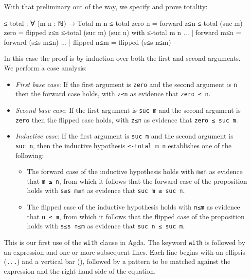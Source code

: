 With that preliminary out of the way, we specify and prove totality:

\begin{fence}
\begin{code}
≤-total : ∀ (m n : ℕ) → Total m n
≤-total zero    n                         =  forward z≤n
≤-total (suc m) zero                      =  flipped z≤n
≤-total (suc m) (suc n) with ≤-total m n
...                        | forward m≤n  =  forward (s≤s m≤n)
...                        | flipped n≤m  =  flipped (s≤s n≤m)
\end{code}
\end{fence}

In this case the proof is by induction over both the first and second
arguments. We perform a case analysis:

\begin{itemize}
\item
  \emph{First base case}: If the first argument is \texttt{zero} and the
  second argument is \texttt{n} then the forward case holds, with
  \texttt{z≤n} as evidence that \texttt{zero\ ≤\ n}.
\item
  \emph{Second base case}: If the first argument is \texttt{suc\ m} and
  the second argument is \texttt{zero} then the flipped case holds, with
  \texttt{z≤n} as evidence that \texttt{zero\ ≤\ suc\ m}.
\item
  \emph{Inductive case}: If the first argument is \texttt{suc\ m} and
  the second argument is \texttt{suc\ n}, then the inductive hypothesis
  \texttt{≤-total\ m\ n} establishes one of the following:

  \begin{itemize}
  \item
    The forward case of the inductive hypothesis holds with \texttt{m≤n}
    as evidence that \texttt{m\ ≤\ n}, from which it follows that the
    forward case of the proposition holds with \texttt{s≤s\ m≤n} as
    evidence that \texttt{suc\ m\ ≤\ suc\ n}.
  \item
    The flipped case of the inductive hypothesis holds with \texttt{n≤m}
    as evidence that \texttt{n\ ≤\ m}, from which it follows that the
    flipped case of the proposition holds with \texttt{s≤s\ n≤m} as
    evidence that \texttt{suc\ n\ ≤\ suc\ m}.
  \end{itemize}
\end{itemize}

This is our first use of the \texttt{with} clause in Agda. The keyword
\texttt{with} is followed by an expression and one or more subsequent
lines. Each line begins with an ellipsis (\texttt{...}) and a vertical
bar (\texttt{\textbar{}}), followed by a pattern to be matched against
the expression and the right-hand side of the equation.


